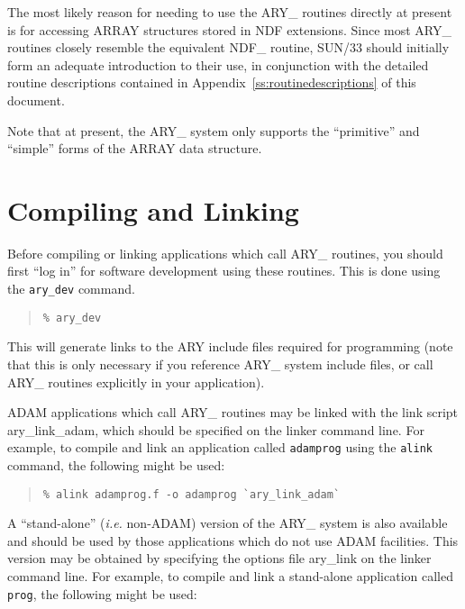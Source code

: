 \documentclass[twoside,11pt]{article}
\newcommand{\xref}[3]{#1}
\newcommand{\xlabel}[1]{}
\begin{document}
The most likely reason for needing to use the ARY\_ routines directly at
present is for accessing ARRAY structures stored in NDF extensions.
Since most ARY\_ routines closely resemble the equivalent NDF\_ routine,
\xref{SUN/33}{sun33}{} should initially form an adequate introduction to 
their use, in conjunction with the detailed routine descriptions contained in 
Appendix~\ref{ss:routinedescriptions} of this document. 

Note that at present, the ARY\_ system only supports the ``primitive'' and
``simple'' forms of the ARRAY data structure. 

\section{\xlabel{compiling_and_linking}Compiling and Linking}
\label{compiling_and_linking}

Before compiling or linking applications which call ARY\_ routines, you
should first ``log in'' for software development using these routines. 
This is done using the \texttt{ary\_dev} command.

\begin{quote}\begin{verbatim}
% ary_dev
\end{verbatim}\end{quote}

This will generate links to the ARY include files required for 
programming (note that this is only necessary if you reference ARY\_
system include files, or call ARY\_ routines explicitly in your
application).

ADAM applications which call ARY\_ routines may be linked with the link
script \mbox{ary\_link\_adam}, which should be specified on the linker
command line.  For example, to compile and link an application called
\texttt{adamprog} using the \texttt{alink} command, the following might be
used:

\begin{quote}\begin{verbatim}
% alink adamprog.f -o adamprog `ary_link_adam`
\end{verbatim}\end{quote}

A ``stand-alone'' (\emph{i.e.} non-ADAM) version of the ARY\_ system is
also available and should be used by those applications which do not
use ADAM facilities.  This version may be obtained by specifying the
options file \mbox{ary\_link} on the linker command line.  For example,
to compile and link a stand-alone application called \texttt{prog}, the
following might be used:
\end{document}

